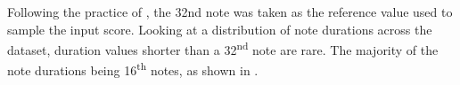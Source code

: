 
Following the practice of \textcite{micchi2020not}, the
\gls{32nd} note was taken as the reference value used to
sample the input score. Looking at a distribution of note
durations across the dataset, duration values shorter than a
32\textsuperscript{nd} note are rare. The majority of the
note durations being 16\textsuperscript{th} notes, as shown
in .


